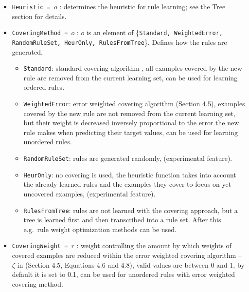 
\begin{itemize}
	\item \texttt{Heuristic = $o$} : determines the heuristic for rule learning; see the Tree section for details.
	\item \texttt{CoveringMethod = $o$} : $o$ is an element of \{\texttt{Standard, %
		WeightedError, %
		RandomRuleSet, %
		HeurOnly, RulesFromTree}\}. Defines how the rules are generated.
	\begin{itemize}
		\item \texttt{Standard}: standard covering algorithm \cite{Michalski1969}, all examples covered by the new rule are removed from the current learning set, can be used for learning ordered rules.
		\item \texttt{WeightedError}: error weighted covering algorithm \cite{Zenko07} (Section 4.5), examples covered by the new rule are not removed from the current learning set, but their weight is decreased inversely proportional to the error the new rule makes when predicting their target values, can be used for learning unordered rules.
		\item \texttt{RandomRuleSet}: rules are generated randomly, (experimental feature).
		\item \texttt{HeurOnly}: no covering is used, the heuristic function takes into account the already learned rules and the examples they cover to focus on yet uncovered examples, (experimental feature).
		\item \texttt{RulesFromTree}: rules are not learned with the covering approach, but a tree is learned first and then transcribed into a rule set. After this e.g.\ rule weight optimization methods can be used.
	\end{itemize}
	\item \texttt{CoveringWeight = $r$} : weight controlling the amount by which weights of covered examples are reduced within the error weighted covering algorithm -- $\zeta$ in \cite{Zenko07} (Section 4.5, Equations 4.6 and 4.8), valid values are between 0 and 1, by default it is set to 0.1, can be used for unordered rules with error weighted covering method.

\end{itemize}
